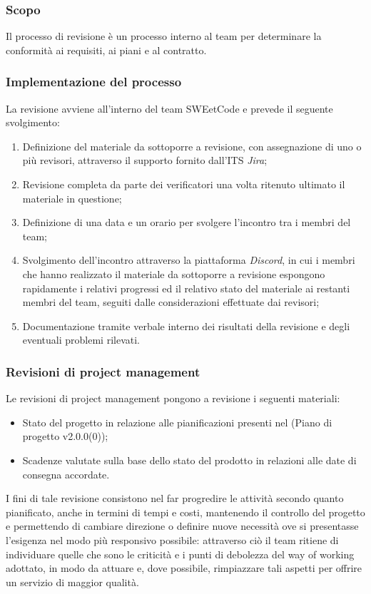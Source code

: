 \documentclass[10pt, a4paper]{article}
\begin{document}
\subsubsection{Scopo}
Il processo di revisione è un processo interno al team per determinare la conformità ai requisiti, ai piani e al contratto.

\subsubsection{Implementazione del processo}
La revisione avviene all'interno del team SWEetCode e prevede il seguente svolgimento:
\begin{enumerate}
    \item Definizione del materiale da sottoporre a revisione, con assegnazione di uno o più revisori, attraverso il supporto fornito dall'ITS \textit{Jira};
    \item Revisione completa da parte dei verificatori una volta ritenuto ultimato il materiale in questione;
    \item Definizione di una data e un orario per svolgere l'incontro tra i membri del team;
    \item Svolgimento dell'incontro attraverso la piattaforma \textit{Discord\pg}, in cui i membri che hanno realizzato il materiale da sottoporre a revisione espongono rapidamente 
    i relativi progressi ed il relativo stato del materiale ai restanti membri del team, seguiti dalle considerazioni effettuate dai revisori;
    \item Documentazione tramite verbale interno dei risultati della revisione e degli eventuali problemi rilevati.
\end{enumerate}

\subsubsection{Revisioni di project management}
Le revisioni di project management pongono a revisione i seguenti materiali:
\begin{itemize}
    \item Stato del progetto in relazione alle pianificazioni presenti nel (Piano di progetto v2.0.0(0));
    \item Scadenze valutate sulla base dello stato del prodotto in relazioni alle date di consegna accordate.
\end{itemize}
I fini di tale revisione consistono nel far progredire le attività secondo quanto pianificato, anche in termini di tempi e costi, mantenendo il controllo del progetto e 
permettendo di cambiare direzione o definire nuove necessità ove si presentasse l'esigenza nel modo più responsivo possibile: attraverso ciò il team
ritiene di individuare quelle che sono le criticità e i punti di debolezza del way of working adottato, in modo da attuare e, dove possibile, rimpiazzare
tali aspetti per offrire un servizio di maggior qualità.
\end{document}
